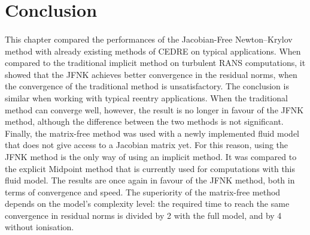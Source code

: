   \section*{Conclusion}

    \paragraph{}
    This chapter compared the performances of the Jacobian-Free Newton--Krylov method with already existing methods of CEDRE on typical applications.
    When compared to the traditional implicit method on turbulent RANS computations, it showed that the JFNK achieves better convergence in the residual norms, when the convergence of the traditional method is unsatisfactory.
    The conclusion is similar when working with typical reentry applications.
    When the traditional method can converge well, however, the result is no longer in favour of the JFNK method, although the difference between the two methods is not significant.
    Finally, the matrix-free method was used with a newly implemented fluid model that does not give access to a Jacobian matrix yet.
    For this reason, using the JFNK method is the only way of using an implicit method.
    It was compared to the explicit Midpoint method that is currently used for computations with this fluid model.
    The results are once again in favour of the JFNK method, both in terms of convergence and speed.
    The superiority of the matrix-free method depends on the model's complexity level: the required time to reach the same convergence in residual norms is divided by 2 with the full model, and by 4 without ionisation.
